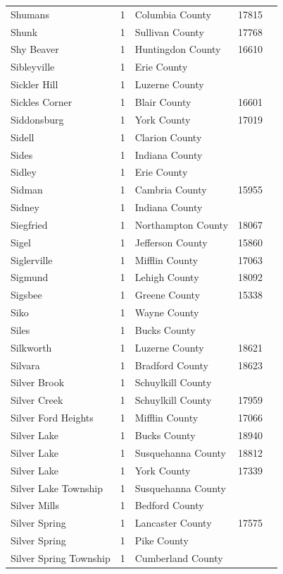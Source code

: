 \documentclass{article}
\begin{document}
\begin{tabular}{lllll}
Shumans & 1 & Columbia County & 17815 &  \\
Shunk & 1 & Sullivan County & 17768 &  \\
Shy Beaver & 1 & Huntingdon County & 16610 &  \\
Sibleyville & 1 & Erie County &  &  \\
Sickler Hill & 1 & Luzerne County &  &  \\
Sickles Corner & 1 & Blair County & 16601 &  \\
Siddonsburg & 1 & York County & 17019 &  \\
Sidell & 1 & Clarion County &  &  \\
Sides & 1 & Indiana County &  &  \\
Sidley & 1 & Erie County &  &  \\
Sidman & 1 & Cambria County & 15955 &  \\
Sidney & 1 & Indiana County &  &  \\
Siegfried & 1 & Northampton County & 18067 &  \\
Sigel & 1 & Jefferson County & 15860 &  \\
Siglerville & 1 & Mifflin County & 17063 &  \\
Sigmund & 1 & Lehigh County & 18092 &  \\
Sigsbee & 1 & Greene County & 15338 &  \\
Siko & 1 & Wayne County &  &  \\
Siles & 1 & Bucks County &  &  \\
Silkworth & 1 & Luzerne County & 18621 &  \\
Silvara & 1 & Bradford County & 18623 &  \\
Silver Brook & 1 & Schuylkill County &  &  \\
Silver Creek & 1 & Schuylkill County & 17959 &  \\
Silver Ford Heights & 1 & Mifflin County & 17066 &  \\
Silver Lake & 1 & Bucks County & 18940 &  \\
Silver Lake & 1 & Susquehanna County & 18812 &  \\
Silver Lake & 1 & York County & 17339 &  \\
Silver Lake Township & 1 & Susquehanna County &  &  \\
Silver Mills & 1 & Bedford County &  &  \\
Silver Spring & 1 & Lancaster County & 17575 &  \\
Silver Spring & 1 & Pike County &  &  \\
Silver Spring Township & 1 & Cumberland County &  &  \\

\end{tabular}
\end{document}
